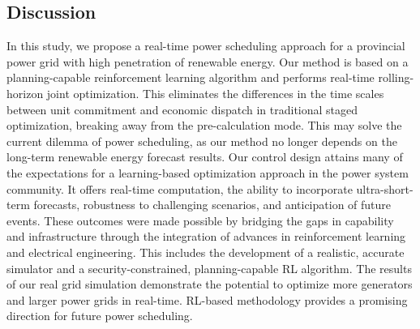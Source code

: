 \subsection*{Discussion}\label{sec12}
In this study, we propose a real-time power scheduling approach for a provincial power grid with high penetration of renewable energy. Our method is based on a planning-capable reinforcement learning algorithm and performs real-time rolling-horizon joint optimization. This eliminates the differences in the time scales between unit commitment and economic dispatch in traditional staged optimization, breaking away from the pre-calculation mode. This may solve the current dilemma of power scheduling, as our method no longer depends on the long-term renewable energy forecast results.
Our control design attains many of the expectations for a learning-based optimization approach in the power system community. It offers real-time computation, the ability to incorporate ultra-short-term forecasts, robustness to challenging scenarios, and anticipation of future events. These outcomes were made possible by bridging the gaps in capability and infrastructure through the integration of advances in reinforcement learning and electrical engineering. This includes the development of a realistic, accurate simulator and a security-constrained, planning-capable RL algorithm. The results of our real grid simulation demonstrate the potential to optimize more generators and larger power grids in real-time. RL-based methodology provides a promising direction for future power scheduling.




